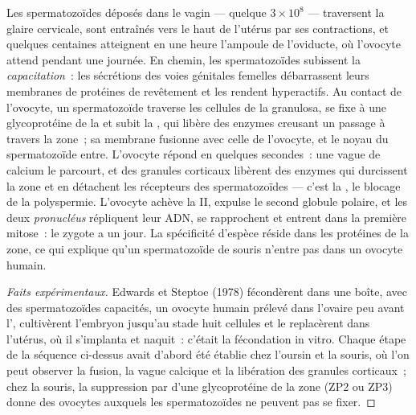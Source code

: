 \begin{proposition}\label{prop:b2:mammal-reproduction:fertilisation}
Les spermatozoïdes déposés dans le vagin --- quelque $3\times 10^{8}$ ---
traversent la glaire cervicale, sont entraînés vers le haut de l'utérus
par ses contractions, et quelques centaines atteignent en une heure
l'ampoule de l'oviducte, où l'ovocyte attend pendant une journée. En
chemin, les spermatozoïdes subissent la \emph{capacitation}~: les
sécrétions des voies génitales femelles débarrassent leurs membranes de
protéines de revêtement et les rendent hyperactifs. Au contact de
l'ovocyte, un spermatozoïde traverse les cellules de la granulosa, se fixe
à une glycoprotéine de la \emph{} et subit la
\emph{}, qui libère des enzymes creusant un passage
à travers la zone~; sa membrane fusionne avec celle de l'ovocyte, et le
noyau du spermatozoïde entre. L'ovocyte répond en quelques secondes~: une
vague de calcium le parcourt, et des granules corticaux libèrent des
enzymes qui durcissent la zone et en détachent les récepteurs des
spermatozoïdes --- c'est la \emph{}, le blocage de la
polyspermie. L'ovocyte achève la  II, expulse le second globule
polaire, et les deux \emph{pronucléus}  répliquent leur ADN, se
rapprochent et entrent dans la première mitose~: le zygote a un jour. La
spécificité d'espèce réside dans les protéines de la zone, ce qui
explique qu'un spermatozoïde de souris n'entre pas dans un ovocyte humain.
\end{proposition}
\begin{proof}[Faits expérimentaux]
Edwards et Steptoe (1978) fécondèrent dans une boîte, avec des
spermatozoïdes capacités, un ovocyte humain prélevé dans l'ovaire peu
avant l', cultivèrent l'embryon jusqu'au stade huit cellules
et le replacèrent dans l'utérus, où il s'implanta et naquit~: c'était la
fécondation in vitro. Chaque étape de la séquence ci-dessus avait
d'abord été établie chez l'oursin et la souris, où l'on peut observer la
fusion, la vague calcique et la libération des granules corticaux~; chez
la souris, la suppression par  d'une glycoprotéine de la zone
(ZP2 ou ZP3) donne des ovocytes auxquels les spermatozoïdes ne peuvent
pas se fixer.
\end{proof}

